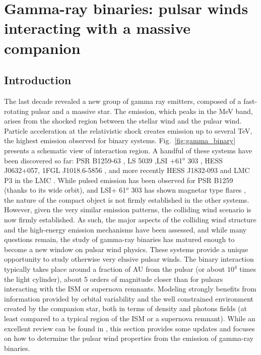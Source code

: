 \section{Gamma-ray binaries: pulsar winds interacting with a massive companion}
\label{sec:binaries}
\subsection{Introduction}
The last decade revealed a new group of gamma ray emitters, composed of a fast-rotating pulsar and a massive star. The emission, which peaks in the MeV band, arises from the shocked region between the stellar wind and the pulsar wind. Particle acceleration at the relativistic shock creates emission up to several TeV, the highest emission observed for binary systems. Fig.~\ref{fig:gamma_binary} presents a schematic view of interaction region. A handful of these systems have been discovered so far: PSR B1259-63 \citep{2005A&A...442....1A}, LS 5039 \citep{2005Sci...309..746A} ,LSI +61$^o$ 303 \citep{2006Sci...312.1771A}, HESS J0632+057\citep{2011ApJ...737L..11B}, 1FGL J1018.6-5856 \citep{2010ApJS..188..405A}, and more recently HESS J1832-093 \citep{2016MNRAS.457.1753E} and LMC P3 in the LMC \citep{2016ApJ...829..105C}. While pulsed emission has been observed for PSR B1259 (thanks to its wide orbit), and LSI+ 61$^o$ 303 has shown magnetar type flares \citep{0004-637X-744-2-106}, the nature of the compact object is not firmly established in the other systems. However, given the very similar emission patterns, the colliding wind scenario is now firmly established. As such, the major aspects of the colliding wind structure and the high-energy emission mechanisms have been assessed, and while many questions remain, the study of  gamma-ray binaries has matured enough to become a new window on pulsar wind physics.  These systems provide a unique opportunity to study otherwise very elusive pulsar winds. The binary interaction typically takes place around a fraction of  AU from the pulsar (or about $10^4$ times the light cylinder), about 5 orders of magnitude closer than for pulsars interacting with the ISM or supernova remnants.  Modeling strongly benefits from information provided by orbital variability and  the well constrained environment created by the companion star, both in terms of density and photons fields (at least compared to a typical region of the ISM or a supernova remnant).  While an excellent review can be found in \citep{2013A&ARv..21...64D}, this section provides some updates and focuses on how to determine the pulsar wind properties from the emission of gamma-ray binaries.


